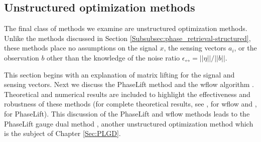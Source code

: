\subsection{Unstructured optimization methods}	 	\label{Subsubsec:phase_retrieval-unstructured}


The final class of methods we examine are unstructured optimization methods.  Unlike the methods discussed in Section \ref{Subsubsec:phase_retrieval-structured}, these methods place no assumptions on the signal $x$, the sensing vectors $a_i$, or the observation $b$ other than the knowledge of the noise ratio $\epsilon_\rel = ||\eta|| / ||b||$.

This section begins with an explanation of matrix lifting for the signal and sensing vectors.  Next we discuss the PhaseLift method \cite{DBLP:journals/siamis/CandesESV13} and the wflow algorithm \cite{DBLP:journals/tit/CandesLS15}.   Theoretical and numerical results are included to highlight the effectiveness and robustness of these methods (for complete theoretical results, see \cite{DBLP:journals/tit/CandesLS15},  \cite{sun2016geometric} for wflow and \cite{candes2014solving}, \cite{candes2013phaselift} for PhaseLift).  This discussion of the PhaseLift and wflow methods leads to the PhaseLift gauge dual method \cite{DBLP:journals/siamsc/FriedlanderM16}, another unstructured optimization method which is the subject of Chapter \ref{Sec:PLGD}.






